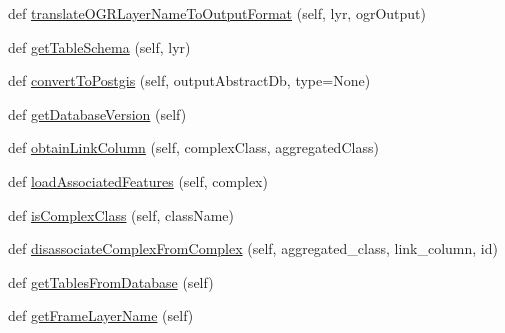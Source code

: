 \begin{DoxyCompactItemize}
def \mbox{\hyperlink{class_dsg_tools_1_1_factories_1_1_db_factory_1_1spatialite_db_1_1_spatialite_db_ae4ad7af93f5880d53ef2a3ca5e9fefcc}{translate\+O\+G\+R\+Layer\+Name\+To\+Output\+Format}} (self, lyr, ogr\+Output)
\item 
def \mbox{\hyperlink{class_dsg_tools_1_1_factories_1_1_db_factory_1_1spatialite_db_1_1_spatialite_db_af91a3c13a7dd2782cd555bfd376eeaa3}{get\+Table\+Schema}} (self, lyr)
\item 
def \mbox{\hyperlink{class_dsg_tools_1_1_factories_1_1_db_factory_1_1spatialite_db_1_1_spatialite_db_a06dd9cc920f62cd988d92bcedabf5a88}{convert\+To\+Postgis}} (self, output\+Abstract\+Db, type=None)
\item 
def \mbox{\hyperlink{class_dsg_tools_1_1_factories_1_1_db_factory_1_1spatialite_db_1_1_spatialite_db_a69bc40bb88ed07db887aa94a652bf0c5}{get\+Database\+Version}} (self)
\item 
def \mbox{\hyperlink{class_dsg_tools_1_1_factories_1_1_db_factory_1_1spatialite_db_1_1_spatialite_db_a2f32ac600aa67edab921aa6c4de83c40}{obtain\+Link\+Column}} (self, complex\+Class, aggregated\+Class)
\item 
def \mbox{\hyperlink{class_dsg_tools_1_1_factories_1_1_db_factory_1_1spatialite_db_1_1_spatialite_db_a8dee410ae184376d36aceabc16ebe13c}{load\+Associated\+Features}} (self, complex)
\item 
def \mbox{\hyperlink{class_dsg_tools_1_1_factories_1_1_db_factory_1_1spatialite_db_1_1_spatialite_db_a410353e9f2234473f8888a4306d2d141}{is\+Complex\+Class}} (self, class\+Name)
\item 
def \mbox{\hyperlink{class_dsg_tools_1_1_factories_1_1_db_factory_1_1spatialite_db_1_1_spatialite_db_ad44549f7cd859c8e5599f35e9effc72c}{disassociate\+Complex\+From\+Complex}} (self, aggregated\+\_\+class, link\+\_\+column, id)
\item 
def \mbox{\hyperlink{class_dsg_tools_1_1_factories_1_1_db_factory_1_1spatialite_db_1_1_spatialite_db_aaae60033f57202171d14f0c266b5fe36}{get\+Tables\+From\+Database}} (self)
\item 
def \mbox{\hyperlink{class_dsg_tools_1_1_factories_1_1_db_factory_1_1spatialite_db_1_1_spatialite_db_a1566bb6fb78ce6c2a7866ee18775debd}{get\+Frame\+Layer\+Name}} (self)
\item 
\mbox{\label{class_dsg_tools_1_1_factories_1_1_db_factory_1_1spatialite_db_1_1_spatialite_db_a451bbdd05528ce05a9a3eb4c751545af}} 

\end{DoxyCompactItemize}
